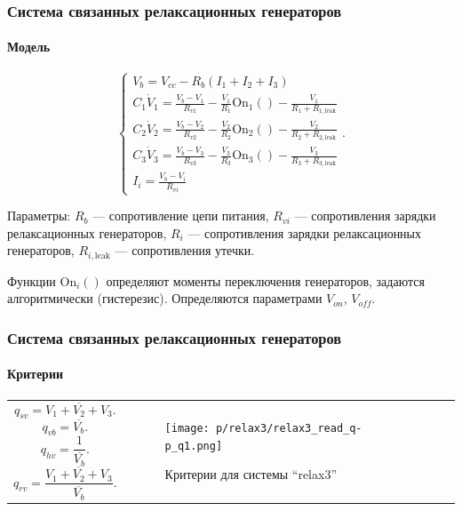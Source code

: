 \documentclass[10pt,utf8]{beamer}
\newlength\TW
\begin{document}
\begin{frame}
  \frametitle{Система связанных релаксационных генераторов}
  \framesubtitle{Модель}

  \begin{equation}
    \begin{cases}
      V_b = V_{cc} - R_b ( I_1 + I_2 + I_3 ) \\
      C_1 \dot{V}_1 = \frac{V_b-V_1}{R_{v1}} - \frac{V_1}{R_1} \mathrm{On}_1() - \frac{V_1}{R_1+R_{1,\mathrm{leak}}} \\
      C_2 \dot{V}_2 = \frac{V_b-V_2}{R_{v2}} - \frac{V_2}{R_2} \mathrm{On}_2() - \frac{V_2}{R_2+R_{2,\mathrm{leak}}} \\
      C_3 \dot{V}_3 = \frac{V_b-V_3}{R_{v3}} - \frac{V_3}{R_3} \mathrm{On}_3() - \frac{V_3}{R_3+R_{3,\mathrm{leak}}} \\
      I_i = \frac{V_b-V_i}{R_{vi}}
    \end{cases}.
    \label{atu:eq:relax3}
  \end{equation}

  Параметры:
  $R_b$ --- сопротивление цепи питания,
  $R_{vi}$ --- сопротивления зарядки релаксационных генераторов,
  $R_{i}$ --- сопротивления зарядки релаксационных генераторов,
  $R_{i,\mathrm{leak}}$ --- сопротивления утечки.

  Функции $ \mathrm{On}_i() $ определяют моменты переключения генераторов,
  задаются алгоритмически (гистерезис). Определяются параметрами
  $V_{on}$, $V_{off}$.


\end{frame}




\begin{frame}
  \frametitle{Система связанных релаксационных генераторов}
  \framesubtitle{Критерии}

  \begin{tabular}{p{40\TW}|p{57\TW}}
    \[
      q_{sv} = \overline{V_1+V_2+V_3} .
    \]
    \[
      q_{vb} = \overline{V_b} .
    \]
    \[
      q_{hv} = \frac{1}{\overline{V_b}} .
    \]
    \[
      q_{rv} = \frac{\overline{V_1+V_2+V_3}}{\overline{V_b}}.
    \]
 &
  \begin{figure}[htb!]
    \centerline{\texttt{[image: p/relax3/relax3\_read\_q-p\_q1.png]} }
    \caption{Критерии для системы ``relax3''}
    \label{atu:f:relax3_q}
  \end{figure}
  \end{tabular}

\end{frame}
\end{document}
